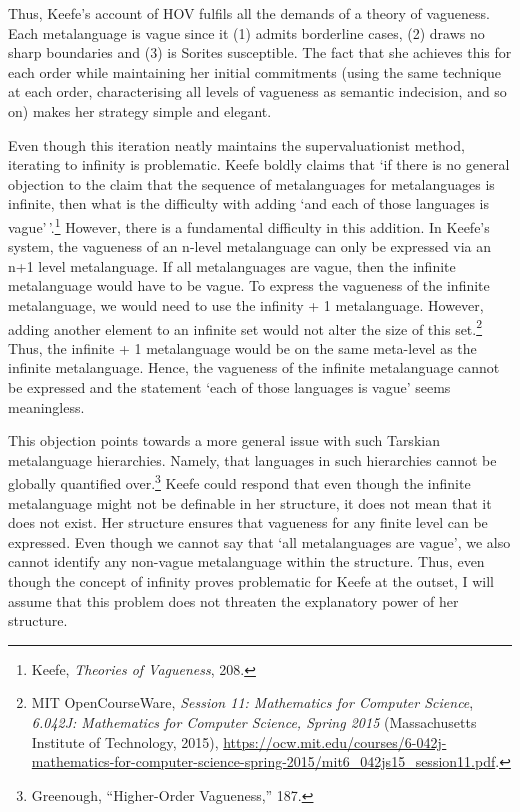 Thus, Keefe's account of HOV fulfils all the demands of a theory of
vagueness. Each metalanguage is vague since it (1) admits borderline
cases, (2) draws no sharp boundaries and (3) is Sorites susceptible. The
fact that she achieves this for each order while maintaining her initial
commitments (using the same technique at each order, characterising all
levels of vagueness as semantic indecision, and so on) makes her
strategy simple and elegant.

Even though this iteration neatly maintains the supervaluationist
method, iterating to infinity is problematic. Keefe boldly claims that
`if there is no general objection to the claim that the sequence of
metalanguages for metalanguages is infinite, then what is the difficulty
with adding `and each of those languages is vague'\,'.\footnote{Keefe,
  \emph{Theories of Vagueness}, 208.} However, there is a fundamental
difficulty in this addition. In Keefe's system, the vagueness of an
n-level metalanguage can only be expressed via an n+1 level
metalanguage. If all metalanguages are vague, then the infinite
metalanguage would have to be vague. To express the vagueness of the
infinite metalanguage, we would need to use the infinity + 1
metalanguage. However, adding another element to an infinite set would
not alter the size of this set.\footnote{MIT OpenCourseWare,
  \emph{Session 11: Mathematics for Computer Science}, \emph{6.042J:
  Mathematics for Computer Science, Spring 2015} (Massachusetts
  Institute of Technology, 2015),
  \url{https://ocw.mit.edu/courses/6-042j-mathematics-for-computer-science-spring-2015/mit6_042js15_session11.pdf}.}
Thus, the infinite + 1 metalanguage would be on the same meta-level as
the infinite metalanguage. Hence, the vagueness of the infinite
metalanguage cannot be expressed and the statement `each of those
languages is vague' seems meaningless.

This objection points towards a more general issue with such Tarskian
metalanguage hierarchies. Namely, that languages in such hierarchies
cannot be globally quantified over.\footnote{Greenough, ``Higher-Order
  Vagueness,'' 187.} Keefe could respond that even though the infinite
metalanguage might not be definable in her structure, it does not mean
that it does not exist. Her structure ensures that vagueness for any
finite level can be expressed. Even though we cannot say that `all
metalanguages are vague', we also cannot identify any non-vague
metalanguage within the structure. Thus, even though the concept of
infinity proves problematic for Keefe at the outset, I will assume that
this problem does not threaten the explanatory power of her structure.

